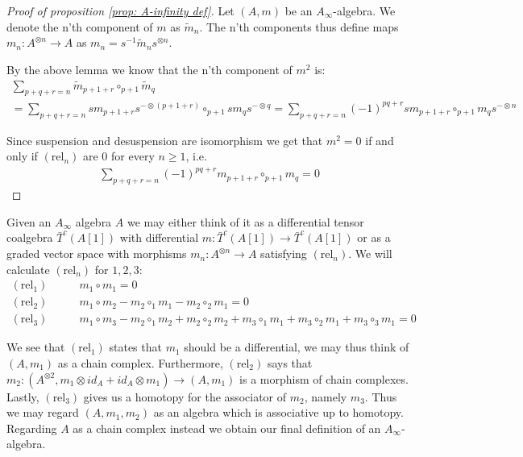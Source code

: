 \documentclass[../thesis.tex]{subfiles}
\begin{document}
        \begin{proof}[Proof of proposition \ref{prop: A-infinity def}]
            Let $(A,m)$ be an $A_\infty$-algebra. We denote the n'th component of $m$ as $\widetilde{m}_n$. The n'th components thus define maps $m_n:A^{\otimes n}\rightarrow A$ as $m_n = s^{-1}\widetilde{m}_ns^{\otimes n}$.

            By the above lemma we know that the n'th component of $m^2$ is:
            \begin{multline*}
                \sum_{p + q + r = n}\widetilde{m}_{p+1+r}\circ_{p+1}\widetilde{m}_q \\
                = \sum_{p + q + r = n}sm_{p+1+r}s^{-\otimes (p+1+r)}\circ_{p+1}sm_qs^{-\otimes q} = \sum_{p + q + r = n}(-1)^{pq+r}sm_{p+1+r}\circ_{p+1}m_q s^{-\otimes n}
            \end{multline*}

            Since suspension and desuspension are isomorphism we get that $m^2 = 0$ if and only if $(\text{rel}_n)$ are $0$ for every $n\geq 1$, i.e.
            \begin{align*}
                \sum_{p+q+r = n} (-1)^{pq+r} m_{p+1+r} \circ_{p+1} m_q = 0
            \end{align*}
        \end{proof}

        Given an $A_\infty$ algebra $A$ we may either think of it as a differential tensor coalgebra $\bar{T}^c(A[1])$ with differential $m: \bar{T}^c(A[1])\rightarrow \bar{T}^c(A[1])$ or as a graded vector space with morphisms $m_n:A^{\otimes n} \rightarrow A$ satisfying $(\text{rel}_n)$. We will calculate $(\text{rel}_n)$ for $1,2,3$:
        \begin{align*}
            (\text{rel}_1)\qquad & m_1\circ m_1 = 0 \\
            (\text{rel}_2)\qquad & m_1\circ m_2 - m_2\circ_{1}m_1 - m_2\circ_2m_1 = 0 \\
            (\text{rel}_3)\qquad & m_1\circ m_3 - m_2\circ_1 m_2 + m_2\circ_2m_2 + m_3\circ_1m_1 + m_3\circ_2m_1 + m_3\circ_3m_1 = 0 
        \end{align*}

        We see that $(\text{rel}_1)$ states that $m_1$ should be a differential, we may thus think of $(A, m_1)$ as a chain complex. Furthermore, $(\text{rel}_2)$ says that $m_2 : (A^{\otimes 2}, m_1\otimes id_A + id_A\otimes m_1) \rightarrow (A, m_1)$ is a morphism of chain complexes. Lastly, $(\text{rel}_3)$ gives us a homotopy for the associator of $m_2$, namely $m_3$. Thus we may regard $(A, m_1, m_2)$ as an algebra which is associative up to homotopy. Regarding $A$ as a chain complex instead we obtain our final definition of an $A_\infty$-algebra.
\end{document}
